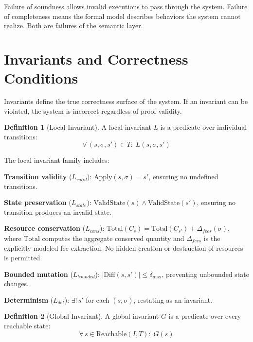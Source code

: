\documentclass[11pt,a4paper]{article}
\theoremstyle{definition}
\newtheorem{definition}{Definition}[section]
\newcommand{\Apply}{\mathrm{Apply}}
\newcommand{\ValidState}{\mathrm{ValidState}}
\begin{document}
Failure of soundness allows invalid executions to pass through the system. Failure of completeness means the formal model describes behaviors the system cannot realize. Both are failures of the semantic layer.

\section{Invariants and Correctness Conditions}
\label{sec:invariants}

Invariants define the true correctness surface of the system. If an invariant can be violated, the system is incorrect regardless of proof validity.

\begin{definition}[Local Invariant]
\label{def:local-invariant}
A local invariant $L$ is a predicate over individual transitions:
\begin{equation}
\forall\, (s, \sigma, s') \in T:\; L(s, \sigma, s')
\end{equation}
\end{definition}

The local invariant family includes:

\noindent\textbf{Transition validity} ($L_{\mathit{valid}}$): $\Apply(s, \sigma) = s'$, ensuring no undefined transitions.

\noindent\textbf{State preservation} ($L_{\mathit{state}}$): $\ValidState(s) \land \ValidState(s')$, ensuring no transition produces an invalid state.

\noindent\textbf{Resource conservation} ($L_{\mathit{cons}}$): $\mathrm{Total}(C_s) = \mathrm{Total}(C_{s'}) + \Delta_{\mathit{fees}}(\sigma)$, where $\mathrm{Total}$ computes the aggregate conserved quantity and $\Delta_{\mathit{fees}}$ is the explicitly modeled fee extraction. No hidden creation or destruction of resources is permitted.

\noindent\textbf{Bounded mutation} ($L_{\mathit{bounded}}$): $|\mathrm{Diff}(s, s')| \leq \delta_{\max}$, preventing unbounded state changes.

\noindent\textbf{Determinism} ($L_{\mathit{det}}$): $\exists!\, s'$ for each $(s, \sigma)$, restating  as an invariant.

\begin{definition}[Global Invariant]
\label{def:global-invariant}
A global invariant $G$ is a predicate over every reachable state:
\begin{equation}
\forall\, s \in \mathrm{Reachable}(I, T):\; G(s)
\end{equation}
\end{definition}
\end{document}
